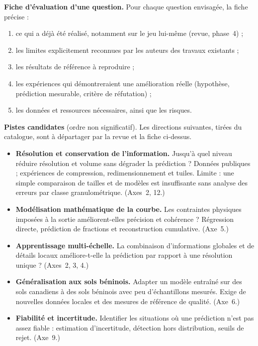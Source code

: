 \documentclass[11pt,a4paper]{article}
\begin{document}
\textbf{Fiche d'évaluation d'une question.} Pour chaque question envisagée, la fiche précise :
\begin{enumerate}
  \item ce qui a déjà été réalisé, notamment sur le jeu lui-même (revue, phase~4) ;
  \item les limites explicitement reconnues par les auteurs des travaux existants ;
  \item les résultats de référence à reproduire ;
  \item les expériences qui démontreraient une amélioration réelle (hypothèse, prédiction mesurable, critère de réfutation) ;
  \item les données et ressources nécessaires, ainsi que les risques.
\end{enumerate}

\textbf{Pistes candidates} (ordre non significatif). Les directions suivantes, tirées du catalogue, sont à départager par la revue et la fiche ci-dessus.
\begin{itemize}
  \item \textbf{Résolution et conservation de l'information.} Jusqu'à quel niveau réduire résolution et volume sans dégrader la prédiction ? Données publiques ; expériences de compression, redimensionnement et tuiles. Limite : une simple comparaison de tailles et de modèles est insuffisante sans analyse des erreurs par classe granulométrique. (Axes~2, 12.)
  \item \textbf{Modélisation mathématique de la courbe.} Les contraintes physiques imposées à la sortie améliorent-elles précision et cohérence ? Régression directe, prédiction de fractions et reconstruction cumulative. (Axe~5.)
  \item \textbf{Apprentissage multi-échelle.} La combinaison d'informations globales et de détails locaux améliore-t-elle la prédiction par rapport à une résolution unique ? (Axes~2, 3, 4.)
  \item \textbf{Généralisation aux sols béninois.} Adapter un modèle entraîné sur des sols canadiens à des sols béninois avec peu d'échantillons mesurés. Exige de nouvelles données locales et des mesures de référence de qualité. (Axe~6.)
  \item \textbf{Fiabilité et incertitude.} Identifier les situations où une prédiction n'est pas assez fiable : estimation d'incertitude, détection hors distribution, seuils de rejet. (Axe~9.)
\end{itemize}

\end{document}
